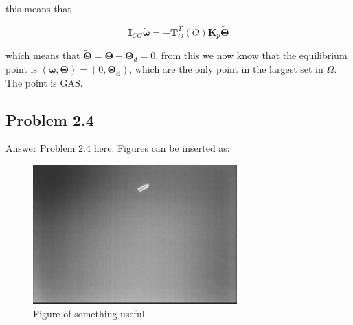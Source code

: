 this means that

\begin{equation}
\boldsymbol{I}_{CG}\dot{\boldsymbol{\omega}} = -\boldsymbol{T}_{\Theta}^T(\Theta)\boldsymbol{K}_p\tilde{\boldsymbol{\Theta}}
\end{equation}

which means that $\tilde{\boldsymbol{\Theta}}= \boldsymbol{\Theta}- \boldsymbol{\Theta}_d = 0$,
from this we now know that the equilibrium point is $(\boldsymbol{\omega},\boldsymbol{\Theta}) = (0,\boldsymbol{\Theta_d})$, which are the only point in the largest set in $\Omega$. The point is GAS. 

\subsection*{Problem 2.4}
Answer Problem 2.4 here. Figures can be inserted as:
\begin{figure}[ht]
	\centering
	\includegraphics[width=0.7\textwidth]{fig1} %
	\caption{Figure of something useful.}
	\label{fig:fig1}
\end{figure}

